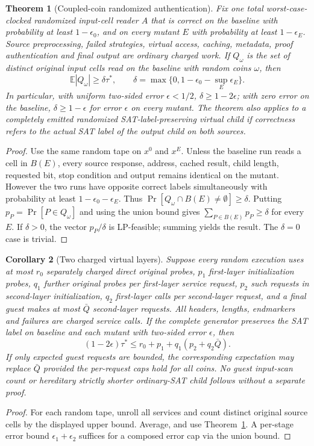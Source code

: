 \documentclass[11pt]{article}
\newtheorem{theorem}{Theorem}
\newtheorem{corollary}[theorem]{Corollary}
\begin{document}
\begin{theorem}[Coupled-coin randomized authentication]\label{th:lp}
Fix one total worst-case-clocked randomized input-cell reader $A$ that is correct on the baseline with probability at least $1-\epsilon_0$, and on every mutant $E$ with probability at least $1-\epsilon_E$. Source preprocessing, failed strategies, virtual access, caching, metadata, proof authentication and final output are ordinary charged work. If $Q_\omega$ is the set of \emph{distinct} original input cells read on the baseline with random coins $\omega$, then
\[
\boxed{\mathbb E|Q_\omega|\ge \delta\tau^*},\qquad
\delta=\max\{0,1-\epsilon_0-\sup_E\epsilon_E\}.
\]
In particular, with uniform two-sided error $\epsilon<1/2$, $\delta\ge1-2\epsilon$; with zero error on the baseline, $\delta\ge1-\epsilon$ for error $\epsilon$ on every mutant. The theorem also applies to a completely emitted randomized SAT-label-preserving virtual child if correctness refers to the \emph{actual SAT label} of the output child on both sources.
\end{theorem}
\begin{proof}
Use the same random tape on $x^0$ and $x^E$. Unless the baseline run reads a cell in $B(E)$, every source response, address, cached result, child length, requested bit, stop condition and output remains identical on the mutant. However the two runs have opposite correct labels simultaneously with probability at least $1-\epsilon_0-\epsilon_E$. Thus
$\Pr[Q_\omega\cap B(E)\ne\emptyset]\ge\delta$.
Putting $p_P=\Pr[P\in Q_\omega]$ and using the union bound gives
$\sum_{P\in B(E)}p_P\ge\delta$ for every $E$. If $\delta>0$, the vector $p_P/\delta$ is LP-feasible; summing yields the result. The $\delta=0$ case is trivial.
\end{proof}

\begin{corollary}[Two charged virtual layers]\label{co:two}
Suppose every random execution uses at most $r_0$ separately charged direct original probes, $p_1$ first-layer initialization probes, $q_1$ further original probes per first-layer service request, $p_2$ such requests in second-layer initialization, $q_2$ first-layer calls per second-layer request, and a final guest makes at most $\bar Q$ second-layer requests. All headers, lengths, endmarkers and failures are charged service calls. If the complete generator preserves the SAT label on baseline and each mutant with two-sided error $\epsilon$, then
\[
(1-2\epsilon)\tau^*\le r_0+p_1+q_1(p_2+q_2\bar Q).
\]
If only expected guest requests are bounded, the corresponding expectation may replace $\bar Q$ provided the per-request caps hold for all coins. No guest input-scan count or hereditary strictly shorter ordinary-SAT child follows without a separate proof.
\end{corollary}
\begin{proof}
For each random tape, unroll all services and count distinct original source cells by the displayed upper bound. Average, and use Theorem~\ref{th:lp}. A per-stage error bound $\epsilon_1+\epsilon_2$ suffices for a composed error cap via the union bound.
\end{proof}
\end{document}
